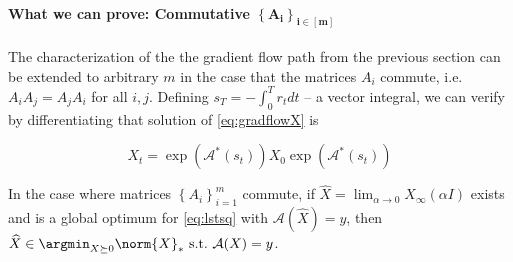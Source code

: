 \paragraph{What we can prove: Commutative $\mathbf{\left\{A_i\right\}_{i\in[m]}}$}
The characterization of the the gradient flow path from the previous section can be extended to arbitrary $m$ in the case that the matrices $A_i$ commute, i.e.~$A_iA_j = A_jA_i$ for all $i,j$. Defining $s_T = -\int_0^T r_tdt$ -- a vector integral, we can verify by differentiating that solution of  \eqref{eq:gradflowX} is

\begin{equation} \label{eq:commutativepath}
X_t = \exp\left( \mathcal{A}^*(s_t)\right)X_0\exp\left( \mathcal{A}^*(s_t) \right)
\end{equation}

\begin{theorem}\label{thm:commutative}
In the case where matrices $\left\{A_i\right\}_{i=1}^m$ commute,  if  $\widehat{X} = \lim_{\alpha\to 0}X_\infty(\alpha I)$ exists and is a global optimum for \eqref{eq:lstsq} with $\mathcal{A}(\widehat{X}) = y$,  then $\widehat{X} \in \argmin_{X\succeq0} \norm{X}_*\ \textrm{s.t.}\ \mathcal{A}(X) = y$.
\end{theorem}

